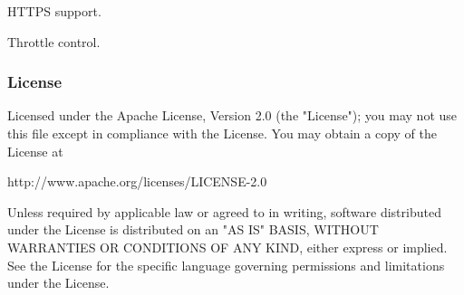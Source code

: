 \begin{DoxyItemize}
\item H\+T\+T\+P\+S support.
\item Throttle control.
\end{DoxyItemize}

\subsubsection*{License}

\begin{DoxyVerb}Licensed under the Apache License, Version 2.0 (the "License");
you may not use this file except in compliance with the License.
You may obtain a copy of the License at

   http://www.apache.org/licenses/LICENSE-2.0

Unless required by applicable law or agreed to in writing, software
distributed under the License is distributed on an "AS IS" BASIS,
WITHOUT WARRANTIES OR CONDITIONS OF ANY KIND, either express or implied.
See the License for the specific language governing permissions and
limitations under the License.\end{DoxyVerb}
 
